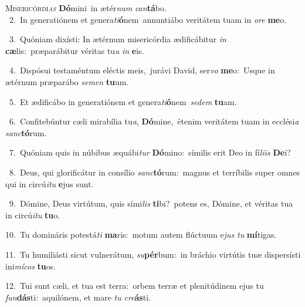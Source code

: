 \lettrine{\initial\textcolor{\initialcolor}{M}}{isericórdi\-\textit{as}\-} \textbf{Dó}\-mini~\star in ætér\textit{num} \textit{can}\-\textbf{tá}bo.\\
{\numbfont\textcolor{\numbcolor}{~2.}}~In generatiónem et genera\-\textit{ti}\-\textbf{ó}nem~\star annuntiábo veritátem tuam in \textit{o}\-\textit{re} \textbf{me}\-o.\par
{\numbfont\textcolor{\numbcolor}{~3.}}~Quóniam dixísti: In ætérnum misericórdia ædificábitur \textit{in} \textbf{cæ}\-lis:~\star præparábitur véritas tu\textit{a} \textit{in} \textbf{e}\-is.\par
{\numbfont\textcolor{\numbcolor}{~4.}}~Dispósui testaméntum eléctis meis,~\dagger jurávi David, ser\textit{vo} \textbf{me}\-o:~\star Usque in ætérnum præparábo \textit{se}\-\textit{men} \textbf{tu}\-um.\par
{\numbfont\textcolor{\numbcolor}{~5.}}~Et ædificábo in generatiónem et genera\-\textit{ti}\-\textbf{ó}nem~\star \textit{se}\-\textit{dem} \textbf{tu}\-am.\par
{\numbfont\textcolor{\numbcolor}{~6.}}~Confitebúntur cæli mirabília tu\-\textit{a}\-, \textbf{Dó}\-mine,~\star étenim veritátem tuam in ecclési\textit{a} \textit{sanc}\-\textbf{tó}rum.\par
{\numbfont\textcolor{\numbcolor}{~7.}}~Quóniam quis in núbibus æquábi\textit{tur} \textbf{Dó}\-mino:~\star símilis erit Deo in fí\-\textit{li}\-\textit{is} \textbf{De}\-i?\par
{\numbfont\textcolor{\numbcolor}{~8.}}~Deus, qui glorificátur in consílio \textit{sanc}\-\textbf{tó}rum:~\star magnus et terríbilis super omnes qui in circú\-\textit{i}\-\textit{tu} \textbf{e}\-jus sunt.\par
{\numbfont\textcolor{\numbcolor}{~9.}}~Dómine, Deus virtútum, quis sími\textit{lis} \textbf{ti}\-bi?~\star potens es, Dómine, et véritas tua in circú\-\textit{i}\-\textit{tu} \textbf{tu}\-o.\par
{\numbfont\textcolor{\numbcolor}{10.}}~Tu domináris potestá\textit{ti} \textbf{ma}\-ris:~\star motum autem flúctuum e\textit{jus} \textit{tu} \textbf{mí}\-tigas.\par
{\numbfont\textcolor{\numbcolor}{11.}}~Tu humiliásti sicut vulnerátum, \textit{su}\-\textbf{pér}bum:~\star in bráchio virtútis tuæ dispersísti ini\-\textit{mí}\-\textit{cos} \textbf{tu}\-os.\par
{\numbfont\textcolor{\numbcolor}{12.}}~Tui sunt cæli, et tua est terra:~\dagger orbem terræ et plenitúdinem ejus tu \textit{fun}\-\textbf{dás}ti:~\star aquilónem, et mare \textit{tu} \textit{cre}\-\textbf{ás}ti.\par
